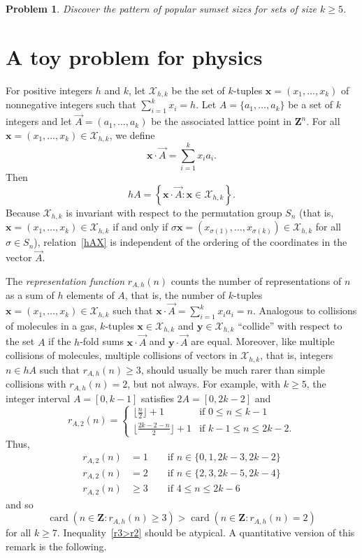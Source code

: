 \documentclass{amsart}
\newtheorem{problem}{Problem}
\newcommand{\bprob}{\begin{problem}}
\newcommand{\eprob}{\end{problem}}
\newcommand{\beq}{\begin{equation}}
\newcommand{\eeq}{\end{equation}}
\newcommand{\Z}{\ensuremath{\mathbf Z}}
\newcommand{\mcx}{\ensuremath{ \mathcal X}}
\newcommand{\mbx}{\ensuremath{ \mathbf x}}
\newcommand{\mby}{\ensuremath{ \mathbf y}}
\DeclareMathOperator{\card}{\text{card}}
\begin{document}
\bprob
Discover the pattern of popular sumset sizes for 
sets of size $k \geq 5$. 
\eprob




\section{A toy problem for physics} 
For positive integers $h$ and $k$, let $\mcx_{h,k}$ be the 
set of $k$-tuples  $\mbx = (x_1,\ldots, x_k)$ of nonnegative integers 
such that $\sum_{i=1}^k x_i = h$.  
Let $A = \{a_1,\ldots, a_k\}$ be a set of $k$ integers 
and let $\vec{A} = (a_1,\ldots, a_k)$ be the associated lattice point 
in $\Z^n$.  
For all $\mbx = (x_1,\ldots, x_k) \in \mcx_{h,k}$, we define 
\[
\mbx\cdot \vec{A} = \sum_{i=1}^k x_ia_i. 
\]
Then 
\beq                \label{hAX}
hA = \left\{\mbx\cdot \vec{A}: \mbx \in \mcx_{h,k} \right\}. 
\eeq
Because $\mcx_{h,k}$ is invariant with respect to the permutation 
group $S_n$ (that is, $\mbx = (x_1,\ldots, x_k) \in \mcx_{h,k}$  
if and only if $\sigma \mbx = (x_{\sigma(1)},\ldots, x_{\sigma(k)}) \in \mcx_{h,k}$ 
for all $\sigma \in S_n$),  relation~\eqref{hAX} 
is independent of the ordering of the coordinates in the vector $\vec{A}$. 



The \emph{representation function} $r_{A,h}(n)$ counts the number 
of representations of $n$ as a sum of $h$ elements of $A$, that is, 
the number of $k$-tuples $\mbx = (x_1,\ldots, x_k) \in \mcx_{h,k}$ 
such that $\mbx \cdot \vec{A} = \sum_{i=1}^k x_ia_i = n$.  
Analogous to collisions of molecules in a gas, 
$k$-tuples $\mbx  \in \mcx_{h,k}$ and $\mby  \in \mcx_{h,k}$ 
``collide'' with respect to the set $A$ if the $h$-fold sums 
$\mbx\cdot \vec{A} $ and $\mby \cdot \vec{A}$ are equal.  
Moreover, like multiple collisions of molecules, 
multiple collisions of vectors in $\mcx_{h,k}$, that is, integers $n \in hA$ 
such that $r_{A,h}(n) \geq 3$, should  usually 
be much rarer than simple collisions with $r_{A,h}(n) = 2$, 
but not always.   For example, with $k \geq 5$, 
the integer interval $A = [0,k-1]$ 
satisfies $2A = [0, 2k-2]$ and  
\[
r_{A,2}(n) = \begin{cases}
\lfloor \frac{n}{2}\rfloor + 1& \text{if $0 \leq n \leq k-1$}\\
\lfloor \frac{2k-2-n}{2}\rfloor + 1& \text{if $k-1 \leq n \leq 2k-2$.} 
\end{cases}
\]
Thus,
\begin{align*}
r_{A,2}(n) & = 1      \qquad  \text{if $n \in \{ 0,1,2k-3,2k-2 \}$} \\
r_{A,2}(n) & =  2     \qquad  \text{if   $n \in \{ 2,3 ,2k-5,2k-4 \}$} \\  
r_{A,2}(n) & \geq 3 \qquad   \text{if  $4 \leq n \leq 2k-6$  } 
\end{align*}
and so 
\beq       \label{r3>r2}
\card\left( n \in \Z: r_{A,h}(n) \geq 3 \right) 
> \card\left( n \in \Z: r_{A,h}(n) = 2 \right)
\eeq
for all $k \geq 7$. 
Inequality~\eqref{r3>r2} should be atypical.  
A quantitative version of this remark is the following.
\end{document}
